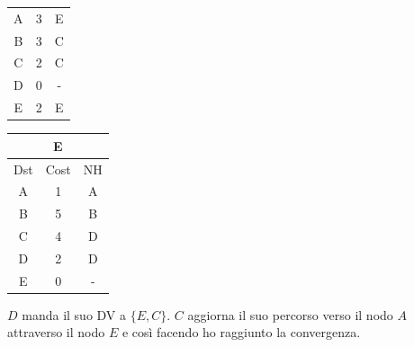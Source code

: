 \documentclass[10pt]{article}
\begin{document}
\begin{table}[h!]
\begin{tabular}{|c||c||c|}
 			\hline
 			A & 3 & E \\
 			B & 3 & C \\
 			C & 2 & C \\
 			D & 0 & - \\
 			E & 2 & E \\
 			\hline
		\end{tabular}
		\begin{tabular}{|c||c||c|}
 			\hline
	 		\multicolumn{3}{|c|}{E} \\
 			\hline
 			Dst & Cost & NH\\
 			\hline
 			A & 1 & A \\
 			B & 5 & B \\
 			C & 4 & D  \\
 			D & 2 & D \\
 			E & 0 & - \\
 			\hline
		\end{tabular}
	\end{table}
	\newline \newline
	$D$ manda il suo DV a $\{E,C\}$.
	\newline
	$C$ aggiorna il suo percorso verso il nodo $A$ attraverso il nodo $E$ e così facendo ho raggiunto la convergenza.
\end{document}
